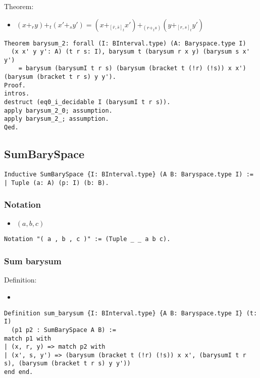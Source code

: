 \documentclass[a4paper,10pt]{article} %
\begin{document}
\subsubsection{}
Theorem:
\begin{itemize}
    \item $(x +_ry) + _t(x' + _sy') = (x + _{[\overline{r}, \overline{s}]_t}x')+ _{(r + _ts)}(y + _{[r, s]_t}y')$
\end{itemize}
\begin{lstlisting}
Theorem barysum_2: forall (I: BInterval.type) (A: Baryspace.type I) 
  (x x' y y': A) (t r s: I), barysum t (barysum r x y) (barysum s x' y')
    = barysum (barysumI t r s) (barysum (bracket t (!r) (!s)) x x') (barysum (bracket t r s) y y').
Proof.
intros.
destruct (eq0_i_decidable I (barysumI t r s)).
apply barysum_2_0; assumption.
apply barysum_2_; assumption.
Qed.
\end{lstlisting}

\subsection{SumBarySpace}
\begin{lstlisting}
Inductive SumBarySpace {I: BInterval.type} (A B: Baryspace.type I) :=
| Tuple (a: A) (p: I) (b: B).
\end{lstlisting}

\subsubsection{Notation}
\begin{itemize}
    \item $(a, b, c)$
\end{itemize}
\begin{lstlisting}
Notation "( a , b , c )" := (Tuple _ _ a b c).
\end{lstlisting}

\subsubsection{Sum barysum}
Definition:
\begin{itemize}
    \item 
\end{itemize}
\begin{lstlisting}
Definition sum_barysum {I: BInterval.type} {A B: Baryspace.type I} (t: I)
  (p1 p2 : SumBarySpace A B) := 
match p1 with
| (x, r, y) => match p2 with 
| (x', s, y') => (barysum (bracket t (!r) (!s)) x x', (barysumI t r s), (barysum (bracket t r s) y y'))
end end.
\end{lstlisting}
\end{document}
